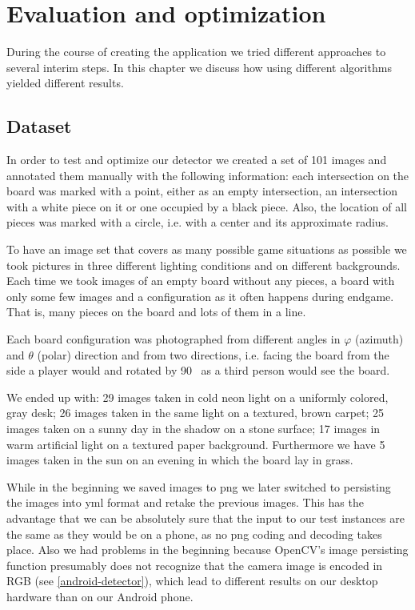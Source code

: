 
\chapter{Evaluation and optimization}
	During the course of creating the application we tried different approaches to several interim steps. In this chapter we discuss how using different algorithms yielded different results.

	\section{Dataset}
	In order to test and optimize our detector we created a set of 101 images and annotated them manually with the following information: each intersection on the board was marked with a point, either as an empty intersection, an intersection with a white piece on it or one occupied by a black piece. Also, the location of all pieces was marked with a circle, i.e. with a center and its approximate radius.

	To have an image set that covers as many possible game situations as possible we took pictures in three different lighting conditions and on different backgrounds. Each time we took images of an empty board without any pieces, a board with only some few images and a configuration as it often happens during endgame. That is, many pieces on the board and lots of them in a line.

	Each board configuration was photographed from different angles in $\varphi$ (azimuth) and $\theta$ (polar) direction and from two directions, i.e. facing the board from the side a player would and rotated by 90\textdegree~ as a third person would see the board.

	We ended up with: 29 images taken in cold neon light on a uniformly colored, gray desk; 26 images taken in the same light on a textured, brown carpet; 25 images taken on a sunny day in the shadow on a stone surface; 17 images in warm artificial light on a textured paper background. Furthermore we have 5 images taken in the sun on an evening in which the board lay in grass.

	While in the beginning we saved images to png we later switched to persisting the images into yml format and retake the previous images. This has the advantage that we can be absolutely sure that the input to our test instances are the same as they would be on a phone, as no png coding and decoding takes place. Also we had problems in the beginning because OpenCV's image persisting function presumably does not recognize that the camera image is encoded in RGB (see \ref{android-detector}), which lead to different results on our desktop hardware than on our Android phone.

